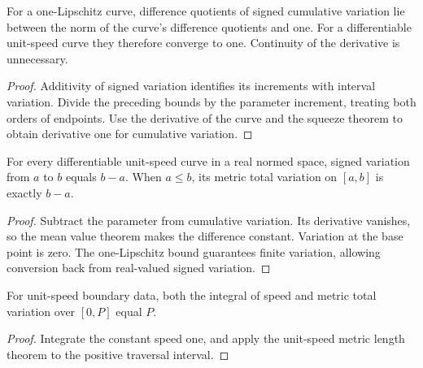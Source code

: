 \begin{lemma}
\label{lem:variation-derivative}
\leanok
{}
For a one-Lipschitz curve, difference quotients of signed cumulative
variation lie between the norm of the curve's difference quotients and
one. For a differentiable unit-speed curve they therefore converge to
one. Continuity of the derivative is unnecessary.
\end{lemma}
\begin{proof}
\leanok
Additivity of signed variation identifies its increments with interval
variation. Divide the preceding bounds by the parameter increment, treating
both orders of endpoints. Use the derivative of the curve and the squeeze
theorem to obtain derivative one for cumulative variation.
\end{proof}

\begin{proposition}
\label{prop:unit-speed-length}
\leanok
{}
For every differentiable unit-speed curve in a real normed space, signed
variation from $a$ to $b$ equals $b-a$. When $a\leq b$, its metric total
variation on $[a,b]$ is exactly $b-a$.
\end{proposition}
\begin{proof}
\leanok
Subtract the parameter from cumulative variation. Its derivative vanishes,
so the mean value theorem makes the difference constant. Variation at the
base point is zero. The one-Lipschitz bound guarantees finite variation,
allowing conversion back from real-valued signed variation.
\end{proof}

\begin{proposition}
\label{prop:boundary-length}
\leanok
{}
For unit-speed boundary data, both the integral of speed and metric total
variation over $[0,P]$ equal $P$.
\end{proposition}
\begin{proof}
\leanok
Integrate the constant speed one, and apply the unit-speed metric length
theorem to the positive traversal interval.
\end{proof}

